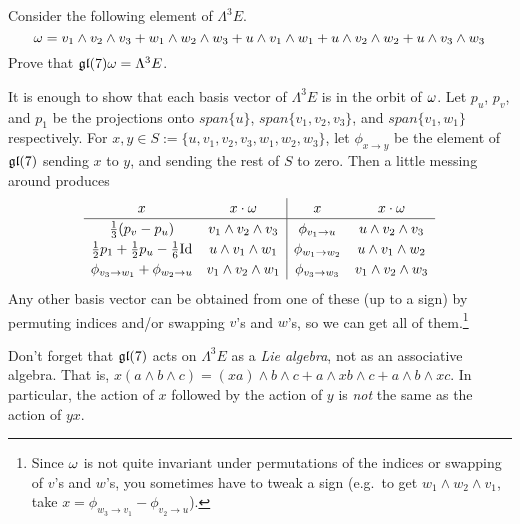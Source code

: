  \begin{exercise} \label{lec17Ex1}
    Consider the following element of $\Lambda^3 E$.
    \[
    \omega=v_1\wedge v_2\wedge v_3 +
    w_1\wedge w_2\wedge w_3 + u\wedge v_1\wedge w_1 + u\wedge v_2 \wedge w_2 + u\wedge
    v_3\wedge w_3
    \]
    Prove that $\mathfrak{gl}(7)\omega=\Lambda^3 E$.
    \begin{solution}
      It is enough to show that each basis vector of $\Lambda^3 E$ is in the orbit of
      $\omega$. Let $p_u$, $p_v$, and $p_1$ be the projections onto $span\{u\}$,
      $span\{v_1,v_2,v_3\}$, and $span\{v_1,w_1\}$ respectively. For $x,y\in
      S:=\{u,v_1,v_2,v_3,w_1,w_2,w_3\}$, let $\phi_{x\to y}$ be the element of
      $\mathfrak{gl}(7)$ sending $x$ to $y$, and sending the rest of $S$ to zero. Then a little
      messing around produces
      \[\renewcommand\arraystretch{1.2}
      \begin{array}{cc|cc}
        x & x\cdot \w & x & x\cdot \w\\ \hline
        \frac{1}{3}(p_v-p_u) & v_1\wedge v_2\wedge v_3 & \phi_{v_1\to u} & u\wedge v_2\wedge v_3\\
        \half p_1 + \half p_u - \frac{1}{6}\id & u\wedge v_1\wedge w_1 & \phi_{w_1\to w_2} & u\wedge v_1\wedge w_2\\
        \phi_{v_3\to w_1}+\phi_{w_2\to u} & v_1\wedge v_2\wedge w_1 & \phi_{v_3\to w_3} & v_1\wedge v_2\wedge w_3
      \end{array}\]
      Any other basis vector can be obtained from one of these (up to a sign) by
      permuting indices and/or swapping $v$'s and $w$'s, so we can get all of
      them.\footnote{Since $\omega$ is not quite invariant under permutations of the
      indices or swapping of $v$'s and $w$'s, you sometimes have to tweak a sign
      (e.g.\ to get $w_1\wedge w_2\wedge v_1$, take $x=\phi_{w_3\to v_1}-\phi_{v_2\to
      u}$).}
    \end{solution}
 \end{exercise}
 \begin{warning}
   Don't forget that $\mathfrak{gl}(7)$ acts on $\Lambda^3 E$ as a \emph{Lie algebra}, not as an
   associative algebra. That is, $x(a\wedge b\wedge c)=(xa)\wedge b\wedge c + a\wedge
   xb\wedge c + a\wedge b\wedge xc$. In particular, the action of $x$ followed by the
   action of $y$ is \emph{not} the same as the action of $yx$.
 \end{warning}

